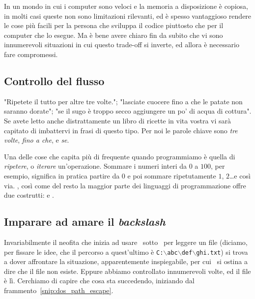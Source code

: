 In un mondo in cui i computer sono veloci e la memoria a disposizione \`e copiosa,
in molti casi queste non sono limitazioni rilevanti, ed \`e spesso vantaggioso rendere
le cose pi\`u facili per la persona che sviluppa il codice piuttosto che per il
computer che lo esegue. Ma \`e bene avere chiaro fin da subito che vi sono innumerevoli
situazioni in cui questo trade-off si inverte, ed allora \`e necessario fare compromessi.


\subsection{Controllo del flusso}

"Ripetete il tutto per altre tre volte."; "lasciate cuocere fino a che le patate
non saranno dorate"; "se il sugo \`e troppo secco aggiungere un po' di acqua di
cottura". Se avete letto anche distrattamente un libro di ricette in vita vostra
vi sar\`a capitato di imbattervi in frasi di questo tipo. Per noi le parole chiave
sono \emph{tre volte}, \emph{fino a che}, e \emph{se}.

Una delle cose che capita pi\`u di frequente quando programmiamo \`e quella di
\emph{ripetere}, o \emph{iterare} un'operazione. Sommare i numeri interi da $0$ a
$100$, per esempio, significa in pratica partire da $0$ e poi sommare ripetutamente
$1$, $2$\ldots e cos\`i via. \python, cos\`i come del resto la maggior parte dei
linguaggi di programmazione offre due costrutti:  e .




\subsection{Imparare ad amare il \emph{backslash}}

Invariabilmente il neofita che inizia ad usare \python\ sotto \windows\ per leggere un
file (diciamo, per fissare le idee, che il percorso a quest'ultimo \`e
\texttt{C:$\backslash$abc$\backslash$def$\backslash$ghi.txt}) si trova a dover affrontare
la situazione, apparentemente inspiegabile, per cui \python\ si ostina a dire che
il file non esiste. Eppure abbiamo controllato innumerevoli volte, ed il file \`e l\`i.
Cerchiamo di capire che cosa sta succedendo, iniziando dal frammento~\ref{snip:dos_path_escape}.


